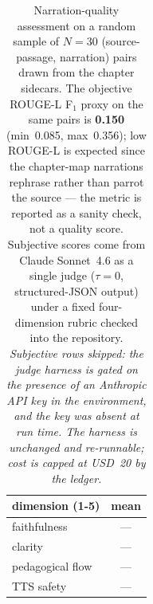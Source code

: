 \begin{table}[!htbp]
\centering
\caption{Narration-quality assessment on a random sample of $N\!=\!30$ (source-passage, narration) pairs drawn from the chapter sidecars.  The objective ROUGE-L F$_1$ proxy on the same pairs is \textbf{0.150} (min~0.085, max~0.356); low ROUGE-L is expected since the chapter-map narrations rephrase rather than parrot the source --- the metric is reported as a sanity check, not a quality score.  Subjective scores come from Claude Sonnet~4.6 as a single judge ($\tau\!=\!0$, structured-JSON output) under a fixed four-dimension rubric checked into the repository.  \textit{Subjective rows skipped: the judge harness is gated on the presence of an Anthropic API key in the environment, and the key was absent at run time. The harness is unchanged and re-runnable; cost is capped at USD~20 by the ledger.}}
\label{tab:m6-narration-judge}
\small
\begin{tabular}{lc}
\toprule
dimension (1-5) & mean \\
\midrule
faithfulness  & --- \\
clarity       & --- \\
pedagogical flow & --- \\
TTS safety    & --- \\
\bottomrule
\end{tabular}
\end{table}

